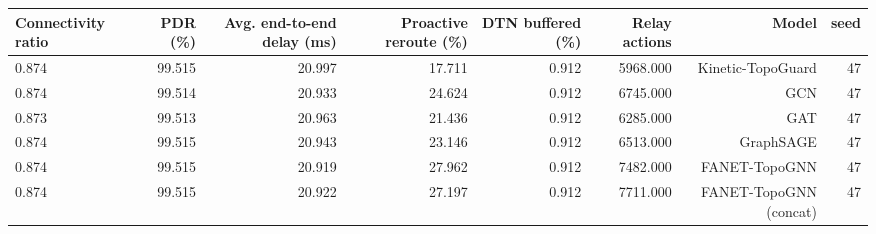 \begin{tabular}{lrrrrrrr}
\toprule
Connectivity ratio & PDR (\%) & Avg. end-to-end delay (ms) & Proactive reroute (\%) & DTN buffered (\%) & Relay actions & Model & seed \\
\midrule
0.874 & 99.515 & 20.997 & 17.711 & 0.912 & 5968.000 & Kinetic-TopoGuard & 47 \\
0.874 & 99.514 & 20.933 & 24.624 & 0.912 & 6745.000 & GCN & 47 \\
0.873 & 99.513 & 20.963 & 21.436 & 0.912 & 6285.000 & GAT & 47 \\
0.874 & 99.515 & 20.943 & 23.146 & 0.912 & 6513.000 & GraphSAGE & 47 \\
0.874 & 99.515 & 20.919 & 27.962 & 0.912 & 7482.000 & FANET-TopoGNN & 47 \\
0.874 & 99.515 & 20.922 & 27.197 & 0.912 & 7711.000 & FANET-TopoGNN (concat) & 47 \\
\bottomrule
\end{tabular}